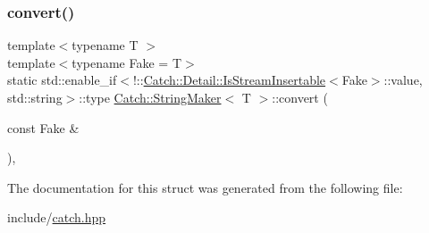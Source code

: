 \mbox{\label{structCatch_1_1StringMaker_abbf104b351212b453b79196523f1a96e}} 
\subsubsection{\texorpdfstring{convert()}{convert()}\hspace{0.1cm}{\footnotesize\ttfamily [2/2]}}
{\footnotesize\ttfamily template$<$typename T $>$ \\
template$<$typename Fake  = T$>$ \\
static std\+::enable\+\_\+if$<$!\+::\mbox{\hyperlink{classCatch_1_1Detail_1_1IsStreamInsertable}{Catch\+::\+Detail\+::\+Is\+Stream\+Insertable}}$<$Fake$>$\+::value, std\+::string$>$\+::type \mbox{\hyperlink{structCatch_1_1StringMaker}{Catch\+::\+String\+Maker}}$<$ T $>$\+::convert (\begin{DoxyParamCaption}\item[{const Fake \&}]{ }\end{DoxyParamCaption})\hspace{0.3cm}{\ttfamily [inline]}, {\ttfamily [static]}}



The documentation for this struct was generated from the following file\+:\begin{DoxyCompactItemize}
\item 
include/\mbox{\hyperlink{catch_8hpp}{catch.\+hpp}}\end{DoxyCompactItemize}
